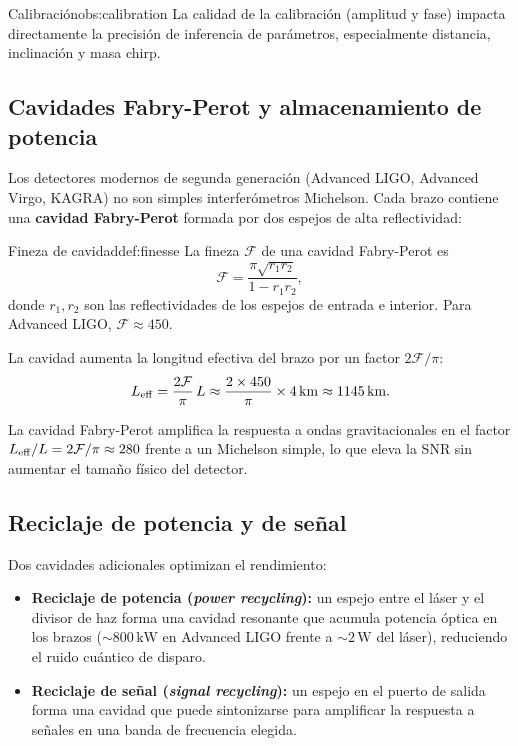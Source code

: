 \begin{observacion}{Calibración}{obs:calibration}
La calidad de la calibración (amplitud y fase) impacta directamente la precisión de inferencia de parámetros, especialmente distancia, inclinación y masa chirp.
\end{observacion}

\subsection{Cavidades Fabry-Perot y almacenamiento de potencia}

Los detectores modernos de segunda generación (Advanced LIGO, Advanced Virgo, KAGRA) no son simples interferómetros Michelson. Cada brazo contiene una \textbf{cavidad Fabry-Perot} formada por dos espejos de alta reflectividad:

\begin{definicion}{Fineza de cavidad}{def:finesse}
La fineza $\mathcal{F}$ de una cavidad Fabry-Perot es
\begin{equation}
  \mathcal{F} = \frac{\pi\sqrt{r_1 r_2}}{1-r_1 r_2},
\end{equation}
donde $r_1, r_2$ son las reflectividades de los espejos de entrada e interior. Para Advanced LIGO, $\mathcal{F}\approx 450$.
\end{definicion}

La cavidad aumenta la longitud efectiva del brazo por un factor $2\mathcal{F}/\pi$:
\begin{equation}
  L_{\rm eff} = \frac{2\mathcal{F}}{\pi}\,L \approx \frac{2\times 450}{\pi}\times 4\,\mathrm{km} \approx 1145\,\mathrm{km}.
  \label{eq:leff}
\end{equation}

\begin{importante}
La cavidad Fabry-Perot amplifica la respuesta a ondas gravitacionales en el factor $L_{\rm eff}/L = 2\mathcal{F}/\pi \approx 280$ frente a un Michelson simple, lo que eleva la SNR sin aumentar el tamaño físico del detector.
\end{importante}

\subsection{Reciclaje de potencia y de señal}

Dos cavidades adicionales optimizan el rendimiento:

\begin{itemize}[leftmargin=2em]
  \item \textbf{Reciclaje de potencia (\emph{power recycling}):} un espejo entre el láser y el divisor de haz forma una cavidad resonante que acumula potencia óptica en los brazos ($\sim 800\,\mathrm{kW}$ en Advanced LIGO frente a $\sim 2\,\mathrm{W}$ del láser), reduciendo el ruido cuántico de disparo.
  \item \textbf{Reciclaje de señal (\emph{signal recycling}):} un espejo en el puerto de salida forma una cavidad que puede sintonizarse para amplificar la respuesta a señales en una banda de frecuencia elegida.
\end{itemize}

